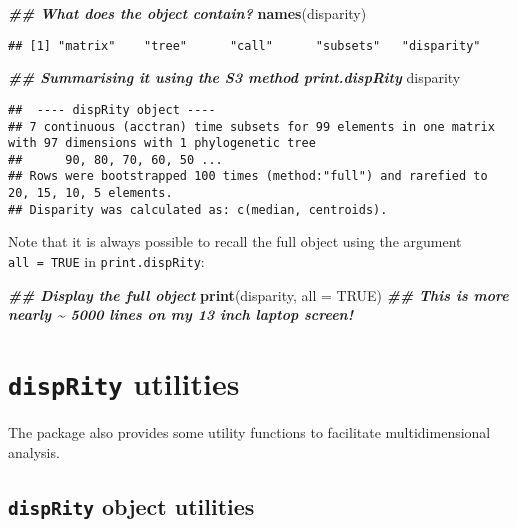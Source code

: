 \documentclass[
]{book}
\newenvironment{Shaded}{\begin{snugshade}}{\end{snugshade}}
\newcommand{\AttributeTok}[1]{\textcolor[rgb]{0.13,0.29,0.53}{#1}}
\newcommand{\ConstantTok}[1]{\textcolor[rgb]{0.56,0.35,0.01}{#1}}
\newcommand{\DocumentationTok}[1]{\textcolor[rgb]{0.56,0.35,0.01}{\textbf{\textit{#1}}}}
\newcommand{\FunctionTok}[1]{\textcolor[rgb]{0.13,0.29,0.53}{\textbf{#1}}}
\newcommand{\NormalTok}[1]{#1}
\begin{document}
\begin{Shaded}
\begin{Highlighting}[]
\DocumentationTok{\#\# What does the object contain?}
\FunctionTok{names}\NormalTok{(disparity)}
\end{Highlighting}
\end{Shaded}

\begin{verbatim}
## [1] "matrix"    "tree"      "call"      "subsets"   "disparity"
\end{verbatim}

\begin{Shaded}
\begin{Highlighting}[]
\DocumentationTok{\#\# Summarising it using the S3 method print.dispRity}
\NormalTok{disparity}
\end{Highlighting}
\end{Shaded}

\begin{verbatim}
##  ---- dispRity object ---- 
## 7 continuous (acctran) time subsets for 99 elements in one matrix with 97 dimensions with 1 phylogenetic tree
##      90, 80, 70, 60, 50 ...
## Rows were bootstrapped 100 times (method:"full") and rarefied to 20, 15, 10, 5 elements.
## Disparity was calculated as: c(median, centroids).
\end{verbatim}

Note that it is always possible to recall the full object using the argument \texttt{all\ =\ TRUE} in \texttt{print.dispRity}:

\begin{Shaded}
\begin{Highlighting}[]
\DocumentationTok{\#\# Display the full object}
\FunctionTok{print}\NormalTok{(disparity, }\AttributeTok{all =} \ConstantTok{TRUE}\NormalTok{)}
\DocumentationTok{\#\# This is more nearly \textasciitilde{} 5000 lines on my 13 inch laptop screen!}
\end{Highlighting}
\end{Shaded}

\hypertarget{utilities}{%
\section{\texorpdfstring{\texttt{dispRity} utilities}{dispRity utilities}}\label{utilities}}

The package also provides some utility functions to facilitate multidimensional analysis.

\hypertarget{disprity-object-utilities}{%
\subsection{\texorpdfstring{\texttt{dispRity} object utilities }{dispRity object utilities }}\label{disprity-object-utilities}}
\end{document}

